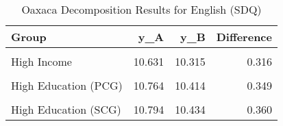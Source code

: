 \begin{table}[!h]

\caption{Oaxaca Decomposition Results for English (SDQ)}
\centering
\begin{tabular}[t]{lrrr}
\toprule
Group & y\_A & y\_B & Difference\\
\midrule
\cellcolor{gray!6}{Low Income} & \cellcolor{gray!6}{10.137} & \cellcolor{gray!6}{9.812} & \cellcolor{gray!6}{0.325}\\
High Income & 10.631 & 10.315 & 0.316\\
\cellcolor{gray!6}{Low Education (PCG)} & \cellcolor{gray!6}{10.223} & \cellcolor{gray!6}{9.899} & \cellcolor{gray!6}{0.324}\\
High Education (PCG) & 10.764 & 10.414 & 0.349\\
\cellcolor{gray!6}{Low Education (SCG)} & \cellcolor{gray!6}{10.223} & \cellcolor{gray!6}{9.898} & \cellcolor{gray!6}{0.325}\\
\addlinespace
High Education (SCG) & 10.794 & 10.434 & 0.360\\
\bottomrule
\end{tabular}
\end{table}
